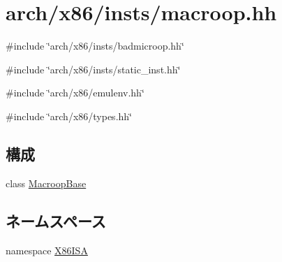\hypertarget{macroop_8hh}{
\section{arch/x86/insts/macroop.hh}
\label{macroop_8hh}
}
{\ttfamily \#include \char`\"{}arch/x86/insts/badmicroop.hh\char`\"{}}\par
{\ttfamily \#include \char`\"{}arch/x86/insts/static\_\-inst.hh\char`\"{}}\par
{\ttfamily \#include \char`\"{}arch/x86/emulenv.hh\char`\"{}}\par
{\ttfamily \#include \char`\"{}arch/x86/types.hh\char`\"{}}\par
\subsection*{構成}
\begin{DoxyCompactItemize}
\item 
class \hyperlink{classX86ISA_1_1MacroopBase}{MacroopBase}
\end{DoxyCompactItemize}
\subsection*{ネームスペース}
\begin{DoxyCompactItemize}
\item 
namespace \hyperlink{namespaceX86ISA}{X86ISA}
\end{DoxyCompactItemize}
